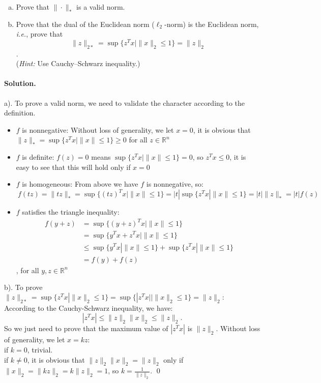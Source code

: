 \documentclass[a4paper]{article}
\newenvironment{solution}
{\color{blue} \paragraph{Solution.}}
{\newline \qed}
\begin{document}
\noindent
\begin{enumerate}[a)]
    \item Prove that $\|\cdot\|_*$ is a valid norm.
    \item Prove that the dual of the Euclidean norm ($\ell_2$-norm) is the Euclidean norm, \emph{i.e.}, prove that
$$\|z\|_{2*} = \sup \{z^Tx | \|x\|_2 \leq 1\} = \|z\|_2$$.\\ (\textit{Hint:} Use Cauchy–Schwarz inequality.)
\end{enumerate}
\begin{solution}
	a). To prove a valid norm, we need to validate the character according to the definition.\\
	\begin{itemize}
    \item $f$ is nonnegative: Without loss of generality, we let $x=0$, it is obvious that $\|z\|_* = \sup \{z^Tx | \|x\| \leq 1\} \geq 0$ for all $z \in \mathbb{R}^n$
    \item $f$ is definite: $f(z) = 0$ means $\sup \{z^Tx | \|x\| \leq 1\} = 0$, so $z^Tx \leq 0$, it is easy to see that this will hold only if $x=0$ 
    \item $f$ is homogeneous: From above we have $f$ is nonnegative, so:
	\begin{equation}\nonumber   
     \ f(tz) = \|tz\|_* = \sup \{(tz)^Tx | \|x\| \leq 1\} = |t|\sup \{z^Tx | \|x\| \leq 1\} = |t| \|z\|_* = |t|f(z)
	\end{equation}    
    \item $f$ satisfies the triangle inequality: 
	\begin{equation}\nonumber
	\begin{aligned}
	\ f(y+z) &= \sup \{(y+z)^Tx | \|x\| \leq 1\} \\&= \sup \{y^Tx + z^Tx | \|x\| \leq 1\} \\&\leq \sup \{y^Tx | \|x\| \leq 1\} + \sup \{z^Tx | \|x\| \leq 1\} \\&= f(y) + f(z)
	\end{aligned}
	\end{equation}	    
, for all $y,z \in  \mathbb{R}^n$
\end{itemize}	 
	b). To prove $\|z\|_{2*} = \sup \{z^Tx | \|x\|_2 \leq 1\} = \sup \{|z^Tx| | \|x\|_2 \leq 1\} =\|z\|_2:$\\According to the Cauchy-Schwarz inequality, we have: $$|z^Tx| \leq \|z\|_2\|x\|_2 \leq \|z\|_2.$$So we just need to prove that the maximum value of $|z^Tx|$ is $\|z\|_2$. Without loss of generality, we let $x=kz$:\\if $k=0$, trivial.\\if $k \not=0$, it is obvious that $\|z\|_2\|x\|_2 = \|z\|_2$ only if $\|x\|_2 = \|kz\|_2 = k\|z\|_2 = 1$, so $k = \frac{1}{\|z\|_2}$.
\end{solution}
\end{document}
